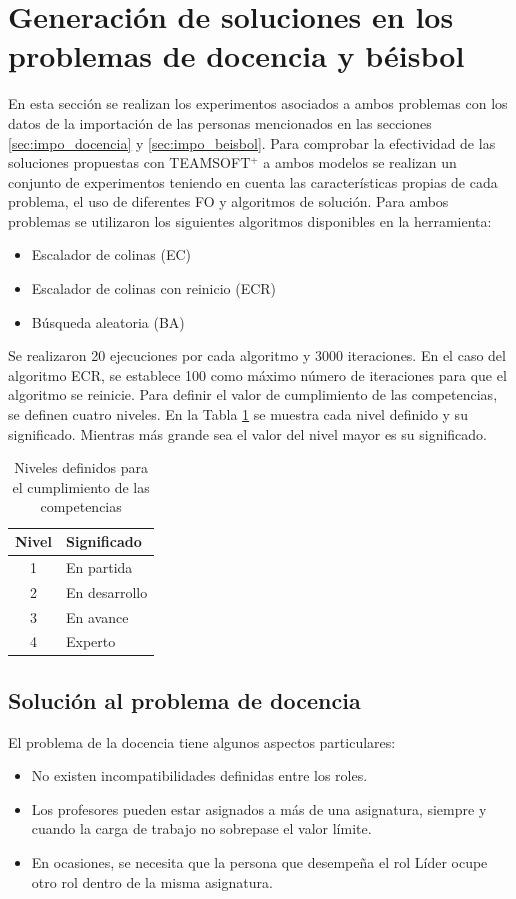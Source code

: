 \section{Generación de soluciones en los problemas de docencia y béisbol}
En esta sección se realizan los experimentos asociados a ambos problemas con los datos de la importación de las personas mencionados en las secciones \ref{sec:impo_docencia} y \ref{sec:impo_beisbol}. Para comprobar la efectividad de las soluciones propuestas con TEAMSOFT$^+$ a ambos modelos se realizan un conjunto de experimentos teniendo en cuenta las características propias de cada problema, el uso de diferentes FO y algoritmos de solución. Para ambos problemas se utilizaron los siguientes algoritmos disponibles en la herramienta: 
\begin{itemize}
	\item Escalador de colinas (EC)
	\item Escalador de colinas con reinicio (ECR)
	\item Búsqueda aleatoria (BA)
\end{itemize}

Se realizaron 20 ejecuciones por cada algoritmo y 3000 iteraciones. En el caso del algoritmo ECR, se establece 100 como máximo número de iteraciones para que el algoritmo se reinicie. Para definir el valor de cumplimiento de las competencias, se definen cuatro niveles. En la Tabla \ref{table:niveles} se muestra cada nivel definido y su significado. Mientras más grande sea el valor del nivel mayor es su significado.

\begin{table}[H]
	\centering
	\caption{Niveles definidos para el cumplimiento de las competencias}\label{table:niveles}
	\begin{tabular}{c l}
		\toprule
		\textbf{Nivel} & \textbf{Significado} \\ \midrule
		1              & En partida           \\
		2              & En desarrollo        \\
		3              & En avance            \\
		4              & Experto              \\ \bottomrule
	\end{tabular}
\end{table}

\subsection{Solución al problema de docencia}
El problema de la docencia tiene algunos aspectos particulares: 
\begin{itemize}
	\item No existen incompatibilidades definidas entre los roles.
	\item Los profesores pueden estar asignados a más de una asignatura, siempre y cuando la carga de trabajo no sobrepase el valor límite.
	\item En ocasiones, se necesita que la persona que desempeña el rol Líder ocupe otro rol dentro de la misma asignatura.
\end{itemize}


